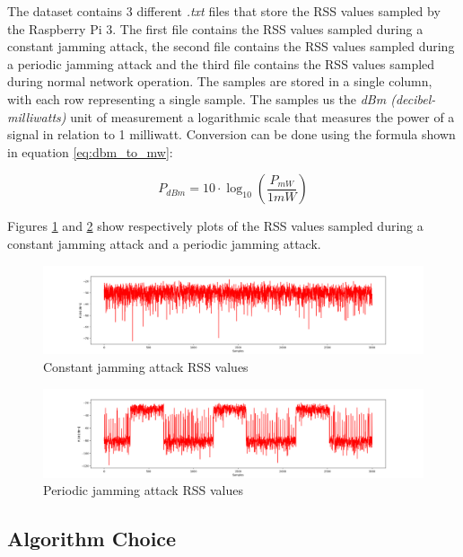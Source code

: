 \documentclass[futureinternet,article,submit,pdftex,moreauthors]{Definitions/mdpi}
\begin{document}
The dataset contains 3 different \textit{.txt} files that store the RSS values sampled by the Raspberry Pi 3. The first file contains the RSS values sampled during a constant jamming attack, the second file contains the RSS values sampled during a periodic jamming attack and the third file contains the RSS values sampled during normal network operation.
The samples are stored in a single column, with each row representing a single sample. The samples us the \textit{dBm (decibel-milliwatts)} unit of measurement a logarithmic scale that measures the power of a signal in relation to 1 milliwatt. 
Conversion can be done using the formula \cite{WirelessCommSobot} shown in equation \ref{eq:dbm_to_mw}:

\begin{linenomath}
	\begin{equation}
		P_{dBm} = 10 \cdot \log_{10} \left( \frac{P_{mW}}{1mW} \right)
		\label{eq:dbm_to_mw}
	\end{equation}
\end{linenomath}

Figures \ref{fig:ConstantJammingSignal} and \ref{fig:PeriodicJammingSignal} show respectively plots of the RSS values sampled during a constant jamming attack and a periodic jamming attack. 

\begin{figure}[H]
	\includegraphics[width=10.5 cm]{img/ConstantJammingSignal.png}
	\caption{Constant jamming attack RSS values}
	\label{fig:ConstantJammingSignal}
\end{figure}   
\unskip
\begin{figure}[H]
	\includegraphics[width=10.5 cm]{img/PeriodicJammingSignal.png}
	\caption{Periodic jamming attack RSS values}
	\label{fig:PeriodicJammingSignal}
\end{figure}   
\unskip

\subsection {Algorithm Choice}
\end{document}
